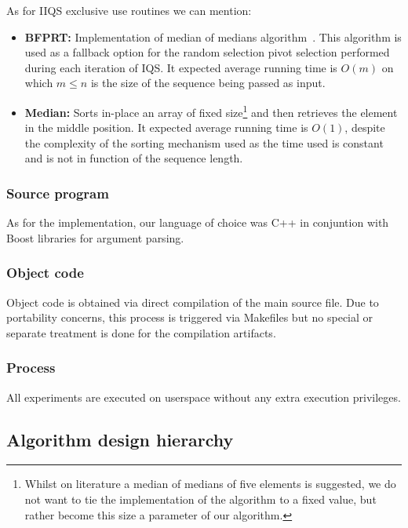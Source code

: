 As for IIQS exclusive use routines we can mention:
\begin{itemize}
    \item \textbf{BFPRT:} Implementation of median of medians algorithm~\cite{Blum_Floyd_Pratt_Rivest_Tarjan_1973}. This algorithm is used as a fallback option for the random selection pivot selection performed during each iteration of IQS. It expected average running time is $O(m)$ on which $m \leq n$ is the size of the sequence being passed as input.
    \item \textbf{Median:} Sorts in-place an array of fixed size\footnote{Whilst on literature a median of medians of five elements is suggested, we do not want to tie the implementation of the algorithm to a fixed value, but rather become this size a parameter of our algorithm.} and then retrieves the element in the middle position. It expected average running time is $O(1)$, despite the complexity of the sorting mechanism used as the time used is constant and is not in function of the sequence length.
\end{itemize}

\subsubsection{Source program}
As for the implementation, our language of choice was C++ in conjuntion with Boost libraries for argument parsing. \\

\subsubsection{Object code}
Object code is obtained via direct compilation of the main source file. Due to portability concerns, this process is triggered via Makefiles but no special or separate treatment is done for the compilation artifacts.\\

\subsubsection{Process}
All experiments are executed on userspace without any extra execution privileges.\\

\subsection{Algorithm design hierarchy}

